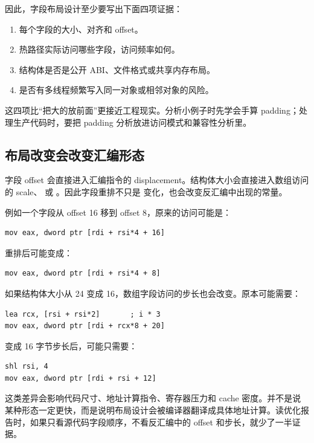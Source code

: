 因此，字段布局设计至少要写出下面四项证据：

\begin{enumerate}
  \item 每个字段的大小、对齐和 offset。
  \item 热路径实际访问哪些字段，访问频率如何。
  \item 结构体是否是公开 ABI、文件格式或共享内存布局。
  \item 是否有多线程频繁写入同一对象或相邻对象的风险。
\end{enumerate}

这四项比“把大的放前面”更接近工程现实。分析小例子时先学会手算 padding；处理生产代码时，要把 padding 分析放进访问模式和兼容性分析里。

\subsection{布局改变会改变汇编形态}

字段 offset 会直接进入汇编指令的 displacement。结构体大小会直接进入数组访问的 scale、 或 。因此字段重排不只是  变化，也会改变反汇编中出现的常量。

例如一个字段从 offset 16 移到 offset 8，原来的访问可能是：

\begin{lstlisting}
mov eax, dword ptr [rdi + rsi*4 + 16]
\end{lstlisting}

重排后可能变成：

\begin{lstlisting}
mov eax, dword ptr [rdi + rsi*4 + 8]
\end{lstlisting}

如果结构体大小从 24 变成 16，数组字段访问的步长也会改变。原本可能需要：

\begin{lstlisting}
lea rcx, [rsi + rsi*2]       ; i * 3
mov eax, dword ptr [rdi + rcx*8 + 20]
\end{lstlisting}

变成 16 字节步长后，可能只需要：

\begin{lstlisting}
shl rsi, 4
mov eax, dword ptr [rdi + rsi + 12]
\end{lstlisting}

这类差异会影响代码尺寸、地址计算指令、寄存器压力和 cache 密度。并不是说某种形态一定更快，而是说明布局设计会被编译器翻译成具体地址计算。读优化报告时，如果只看源代码字段顺序，不看反汇编中的 offset 和步长，就少了一半证据。


